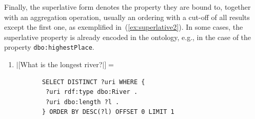 \documentclass[11pt]{article}
\begin{document}
\vspace{-1.5em}
Finally, the superlative form denotes the property they are bound to, together with an aggregation operation, 
usually an ordering with a cut-off of all results except the first one, as exemplified in~(\ref{ex:superlative2}). 
In some cases, the superlative property is already encoded in the ontology, e.g., in the case of the property {\tt dbo:highestPlace}. 
\begin{enumerate}
\item $|[$What is the longest river?$|]=$
       \begin{small}\begin{verbatim}
       SELECT DISTINCT ?uri WHERE { 
        ?uri rdf:type dbo:River . 
        ?uri dbo:length ?l . 
       } ORDER BY DESC(?l) OFFSET 0 LIMIT 1 
       \end{verbatim}\end{small}
\label{ex:superlative2}
\end{enumerate}
\end{document}
